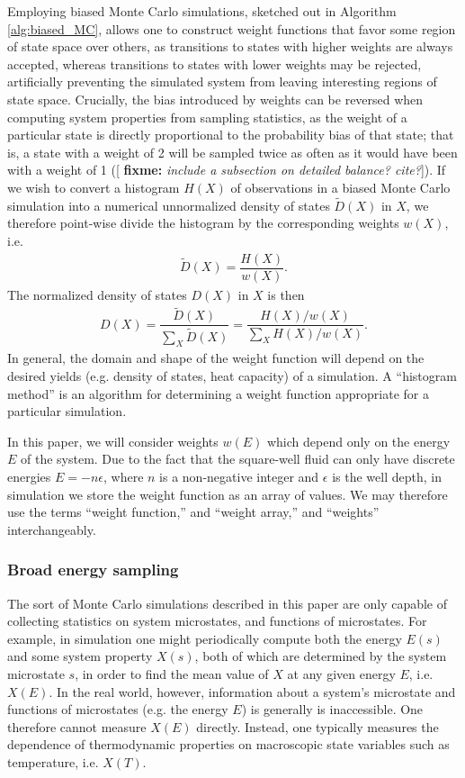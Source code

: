 \documentclass[11pt]{article}
\newcommand{\f}[2]{\dfrac{#1}{#2}} %
\newcommand{\p}[1]{\left(#1\right)} %
\newcommand{\red}[1]{{\bf \color{red} #1}}
\newcommand{\fixme}[1]{[\red{fixme:} \emph{#1}]}
\begin{document}
Employing biased Monte Carlo simulations, sketched out in Algorithm
\ref{alg:biased_MC}, allows one to construct weight functions that
favor some region of state space over others, as transitions to states
with higher weights are always accepted, whereas transitions to states
with lower weights may be rejected, artificially preventing the
simulated system from leaving interesting regions of state
space. Crucially, the bias introduced by weights can be reversed when
computing system properties from sampling statistics, as the weight of
a particular state is directly proportional to the probability bias of
that state; that is, a state with a weight of 2 will be sampled twice
as often as it would have been with a weight of 1 (\fixme{include a
  subsection on detailed balance? cite?}). If we wish to convert a
histogram $H\p{X}$ of observations in a biased Monte Carlo simulation
into a numerical unnormalized density of states $\tilde D\p{X}$ in
$X$, we therefore point-wise divide the histogram by the corresponding
weights $w\p{X}$, i.e.
\begin{align}
  \tilde D\p{X}=\f{H\p{X}}{w\p{X}}.
  \label{eq:dos_unnormed}
\end{align}
The normalized density of states $D\p{X}$ in $X$ is then
\begin{align}
  D\p{X}=\f{\tilde D\p{X}}{\sum_X\tilde D\p{X}}
  =\f{H\p{X}/w\p{X}}{\sum_XH\p{X}/w\p{X}}.
  \label{eq:dos}
\end{align}
In general, the domain and shape of the weight function will depend on
the desired yields (e.g.  density of states, heat capacity) of a
simulation. A ``histogram method'' is an algorithm for determining a
weight function appropriate for a particular simulation.

In this paper, we will consider weights $w\p{E}$ which depend only on
the energy $E$ of the system. Due to the fact that the square-well
fluid can only have discrete energies $E=-n\epsilon$, where $n$ is a
non-negative integer and $\epsilon$ is the well depth, in simulation
we store the weight function as an array of values. We may therefore
use the terms ``weight function,'' and ``weight array,'' and
``weights'' interchangeably.

\subsubsection{Broad energy sampling}
\label{sec:broad_energy_sampling}

The sort of Monte Carlo simulations described in this paper are only
capable of collecting statistics on system microstates, and functions
of microstates. For example, in simulation one might periodically
compute both the energy $E\p{s}$ and some system property $X\p{s}$,
both of which are determined by the system microstate $s$, in order to
find the mean value of $X$ at any given energy $E$, i.e. $X\p{E}$. In
the real world, however, information about a system's microstate and
functions of microstates (e.g. the energy $E$) is generally is
inaccessible. One therefore cannot measure $X\p{E}$ directly. Instead,
one typically measures the dependence of thermodynamic properties on
macroscopic state variables such as temperature, i.e. $X\p{T}$.
\end{document}
